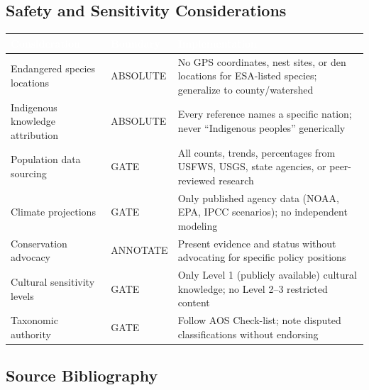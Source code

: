 \documentclass[11pt,letterpaper]{article}
\newcommand{\tableheader}[1]{\textbf{\sffamily\textcolor{white}{#1}}}
\begin{document}
\subsection{Safety and Sensitivity Considerations}

\begin{center}
\begin{tabularx}{\textwidth}{L{3.5cm}C{2cm}X}
\toprule
{}
\tableheader{Consideration} & \tableheader{Boundary} & \tableheader{Implementation} \\
\midrule
Endangered species locations & ABSOLUTE & No GPS coordinates, nest sites, or den locations for ESA-listed species; generalize to county/watershed \\
Indigenous knowledge attribution & ABSOLUTE & Every reference names a specific nation; never ``Indigenous peoples'' generically \\
Population data sourcing & GATE & All counts, trends, percentages from USFWS, USGS, state agencies, or peer-reviewed research \\
Climate projections & GATE & Only published agency data (NOAA, EPA, IPCC scenarios); no independent modeling \\
Conservation advocacy & ANNOTATE & Present evidence and status without advocating for specific policy positions \\
Cultural sensitivity levels & GATE & Only Level 1 (publicly available) cultural knowledge; no Level 2--3 restricted content \\
Taxonomic authority & GATE & Follow AOS Check-list; note disputed classifications without endorsing \\
\bottomrule
\end{tabularx}
\end{center}

\subsection{Source Bibliography}
\end{document}
